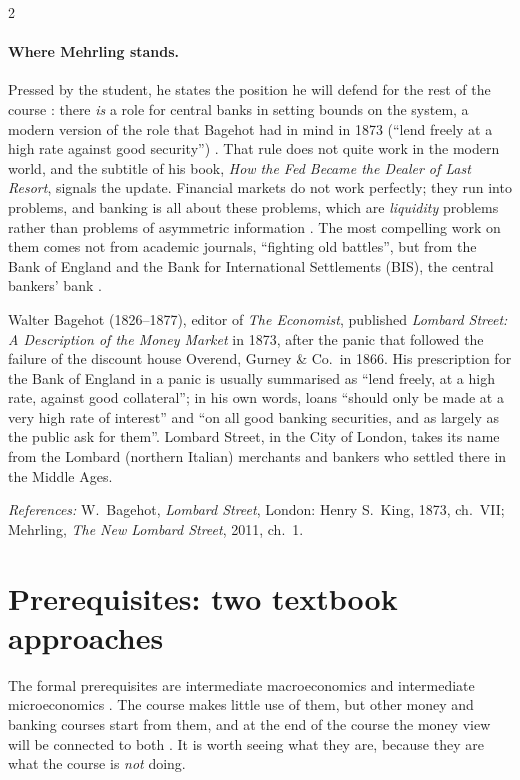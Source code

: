 \begin{paracol}{2}
\paragraph{Where Mehrling stands.} Pressed by the student, he states the position he will defend for the
rest of the course : there \emph{is} a role for central banks in setting bounds on the
system, a modern version of the role that Bagehot had in mind in 1873 (``lend freely at a high rate against
good security'') . That rule does not quite work in the modern world, and the subtitle of his
book, \emph{How the Fed Became the Dealer of Last Resort}, signals the update. Financial markets do not work
perfectly; they run into problems, and banking is all about these problems, which are \emph{liquidity}
problems rather than problems of asymmetric information . The most compelling work on them
comes not from academic journals, ``fighting old battles'', but from the Bank of England and the Bank for
International Settlements (BIS), the central bankers' bank .\begin{history}
Walter Bagehot (1826--1877), editor of \emph{The Economist}, published \emph{Lombard Street: A Description of
the Money Market} in 1873, after the panic that followed the failure of the discount house Overend, Gurney \&
Co.\ in 1866. His prescription for the Bank of England in a panic is usually summarised as ``lend freely, at a
high rate, against good collateral''; in his own words, loans ``should only be made at a very high rate of
interest'' and ``on all good banking securities, and as largely as the public ask for them''. Lombard Street,
in the City of London, takes its name from the Lombard (northern Italian) merchants and bankers who settled
there in the Middle Ages.\par
\emph{References:} W.~Bagehot, \emph{Lombard Street}, London: Henry S.~King, 1873, ch.~VII; Mehrling,
\emph{The New Lombard Street}, 2011, ch.~1.
\end{history}

\section{Prerequisites: two textbook approaches}\label{sec:fp-prereq}

The formal prerequisites are intermediate macroeconomics and intermediate microeconomics
. The course makes little use of them, but other money and banking courses start from them,
and at the end of the course the money view will be connected to both . It is worth seeing what
they are, because they are what the course is \emph{not} doing.


\end{paracol}
